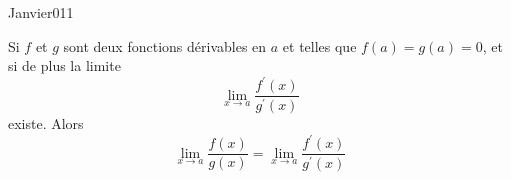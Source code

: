 \begin{corrige}{Janvier011}


Si $f$ et $g$ sont deux fonctions dérivables en $a$ et telles que
$f(a) = g(a) = 0$, et si de plus la limite
\begin{equation}
  \lim_{x \to a} \frac{f^\prime(x)}{g^\prime(x)}
\end{equation}
existe. Alors
\begin{equation}
    \lim_{x \to a} \frac{f(x)}{g(x)}=  \lim_{x \to a} \frac{f^\prime(x)}{g^\prime(x)}
\end{equation}


\end{corrige}
